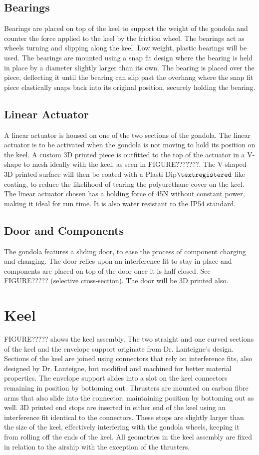 \documentclass[../main.tex]{subfiles}
\begin{document}
\subsection{Bearings}
Bearings are placed on top of the keel to support the weight of the gondola and counter the force applied to the keel by the friction wheel. The bearings act as wheels turning and slipping along the keel. Low weight, plastic bearings will be used. The bearings are mounted using a snap fit design where the bearing is held in place by a diameter slightly larger than its own. The bearing is placed over the piece, deflecting it until the bearing can slip past the overhang where the snap fit piece elastically snaps back into its original position, securely holding the bearing.
\\
\subsection{Linear Actuator}
A linear actuator is housed on one of the two sections of the gondola. The linear actuator is to be activated when the gondola is not moving to hold its position on the keel. A custom 3D printed piece is outfitted to the top of the actuator in a V-shape to mesh ideally with the keel, as seen in FIGURE???????. The V-shaped 3D printed surface will then be coated with a Plasti Dip${\textregistered}$ like coating, to reduce the likelihood of tearing the polyurethane cover on the keel.  The  linear actuator chosen has a holding force of 45N without constant power, making it ideal for run time. It is also water resistant to the IP54 standard. 
\\
\subsection{Door and Components}
The gondola features a sliding door, to ease the process of component charging and changing. The door relies upon an interference fit to stay in place and components are placed on top of the door once it is half closed. See FIGURE????? (selective cross-section). The door will be 3D printed also.
\\
\section{Keel}
FIGURE????? shows the keel assembly. The two straight and one curved sections of the keel and the envelope support originate from Dr. Lanteigne's design. Sections of the keel are joined using connectors that rely on interference fits, also designed by Dr. Lanteigne, but modified and machined for better material properties. The envelope support slides into a slot on the keel connectors remaining in position by bottoming out. Thrusters are mounted on carbon fibre arms that also slide into the connector, maintaining position by bottoming out as well. 3D printed end stops are inserted in either end of the keel using an interference fit identical to the connectors. These stops are slightly larger than the size of the keel, effectively interfering with the gondola wheels, keeping it from rolling off the ends of the keel. All geometries in the keel assembly are fixed in relation to the airship with the exception of the thrusters.
\\
\end{document}
